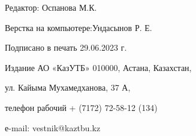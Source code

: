 \newpage

\thispagestyle{empty}
\null
\vfill
\begin{center}
Редактор: Оспанова М.К.

Верстка на компьютере:Ундасынов Р. Е.

Подписано в печать 29.06.2023 г.

Издание АО «КазУТБ» 010000, Астана, Казахстан,

ул. Кайыма Мухамедханова, 37 А,

телефон рабочий + (7172) 72-58-12 (134)

е-mail: vestnik@kaztbu.kz
\end{center}
\vfill
\null
